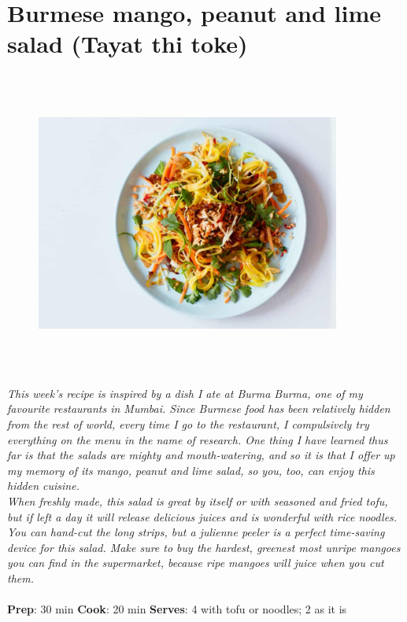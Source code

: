 \documentclass{book}
\begin{document}
\section{Burmese mango, peanut and lime salad (Tayat thi toke)}
\begin{figure}
\centering\includegraphics[width=10cm,height=10cm,keepaspectratio]{Recipe_Pictures/Burmese_mango,_peanut_and_lime_salad_(Tayat_thi_toke).png}
\end{figure}
\emph{This week’s recipe is inspired by a dish I ate at Burma Burma, one of my favourite restaurants in Mumbai. Since Burmese food has been relatively hidden from the rest of world, every time I go to the restaurant, I compulsively try everything on the menu in the name of research. One thing I have learned thus far is that the salads are mighty and mouth-watering, and so it is that I offer up my memory of its mango, peanut and lime salad, so you, too, can enjoy this hidden cuisine.\\ 
When freshly made, this salad is great by itself or with seasoned and fried tofu, but if left a day it will release delicious juices and is wonderful with rice noodles. You can hand-cut the long strips, but a julienne peeler is a perfect time-saving device for this salad. Make sure to buy the hardest, greenest most unripe mangoes you can find in the supermarket, because ripe mangoes will juice when you cut them.}\\\\ 
\textbf{Prep}: 30 min
\textbf{Cook}: 20 min
\textbf{Serves}: 4 with tofu or noodles; 2 as it is
\end{document}
